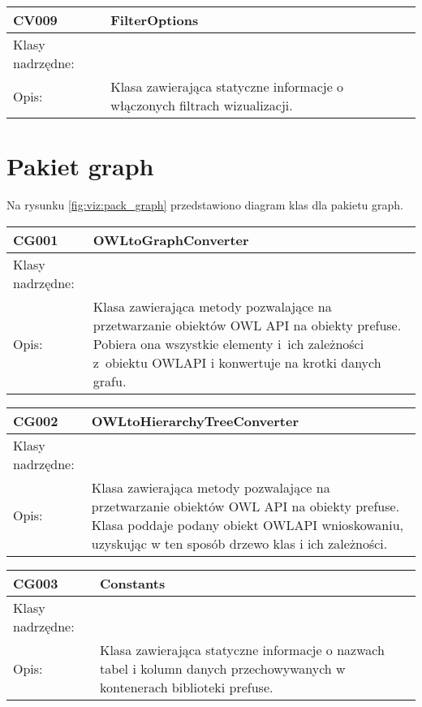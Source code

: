 \begin{longtable}{|m{3.5cm}|m{8.5cm}|} \hline

CV009 & FilterOptions \\ \hline
Klasy nadrzędne: &   \\ \hline
Opis: &  Klasa zawierająca statyczne informacje o włączonych filtrach wizualizacji. \\ \hline


\end{longtable}


\section{Pakiet graph}

Na rysunku  \figurename \space \ref{fig:viz:pack_graph}  przedstawiono diagram klas dla pakietu graph.

\begin{center}
 


\begin{longtable}{|m{3.5cm}|m{8.5cm}|} \hline

CG001 & OWLtoGraphConverter \\ \hline
Klasy nadrzędne: &     \\ \hline
Opis: & Klasa zawierająca metody pozwalające na przetwarzanie obiektów OWL API na obiekty prefuse. Pobiera ona wszystkie elementy i~ich zależności
z~obiektu OWLAPI i konwertuje na krotki danych grafu. \\ \hline

\end{longtable}

\begin{longtable}{|m{3.5cm}|m{8.5cm}|} \hline


CG002 & OWLtoHierarchyTreeConverter \\ \hline
Klasy nadrzędne: &     \\ \hline
Opis: & Klasa zawierająca metody pozwalające na przetwarzanie obiektów OWL API na obiekty prefuse. Klasa poddaje podany obiekt OWLAPI wnioskowaniu, 
uzyskując w ten sposób drzewo klas i ich zależności.  \\ \hline

\end{longtable}

\begin{longtable}{|m{3.5cm}|m{8.5cm}|} \hline

CG003 & Constants \\ \hline
Klasy nadrzędne: &     \\ \hline
Opis: & Klasa zawierająca statyczne informacje o nazwach tabel i kolumn danych przechowywanych w kontenerach biblioteki prefuse. \\ \hline


\end{longtable}

\end{center}
\newpage
